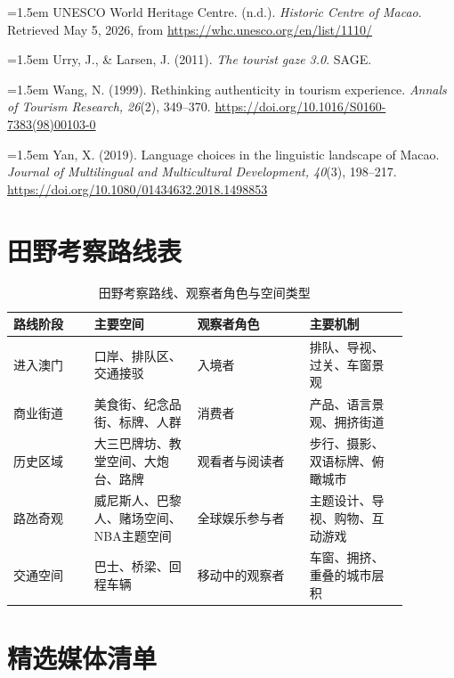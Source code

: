\documentclass[12pt,a4paper]{article}
\begin{document}
\noindent\hangindent=1.5em
UNESCO World Heritage Centre. (n.d.). \textit{Historic Centre of Macao}. Retrieved May 5, 2026, from \url{https://whc.unesco.org/en/list/1110/}

\noindent\hangindent=1.5em
Urry, J., \& Larsen, J. (2011). \textit{The tourist gaze 3.0}. SAGE.

\noindent\hangindent=1.5em
Wang, N. (1999). Rethinking authenticity in tourism experience. \textit{Annals of Tourism Research, 26}(2), 349--370. \url{https://doi.org/10.1016/S0160-7383(98)00103-0}

\noindent\hangindent=1.5em
Yan, X. (2019). Language choices in the linguistic landscape of Macao. \textit{Journal of Multilingual and Multicultural Development, 40}(3), 198--217. \url{https://doi.org/10.1080/01434632.2018.1498853}

\appendix

\section{田野考察路线表}

\begin{table}[H]
\centering
\caption{田野考察路线、观察者角色与空间类型}
\begin{tabular}{>{\raggedright\arraybackslash}p{0.18\linewidth}>{\raggedright\arraybackslash}p{0.23\linewidth}>{\raggedright\arraybackslash}p{0.25\linewidth}>{\raggedright\arraybackslash}p{0.22\linewidth}}
\toprule
路线阶段 & 主要空间 & 观察者角色 & 主要机制 \\
\midrule
进入澳门 & 口岸、排队区、交通接驳 & 入境者 & 排队、导视、过关、车窗景观 \\
商业街道 & 美食街、纪念品街、标牌、人群 & 消费者 & 产品、语言景观、拥挤街道 \\
历史区域 & 大三巴牌坊、教堂空间、大炮台、路牌 & 观看者与阅读者 & 步行、摄影、双语标牌、俯瞰城市 \\
路氹奇观 & 威尼斯人、巴黎人、赌场空间、NBA主题空间 & 全球娱乐参与者 & 主题设计、导视、购物、互动游戏 \\
交通空间 & 巴士、桥梁、回程车辆 & 移动中的观察者 & 车窗、拥挤、重叠的城市层积 \\
\bottomrule
\end{tabular}
\end{table}

\section{精选媒体清单}
\end{document}
